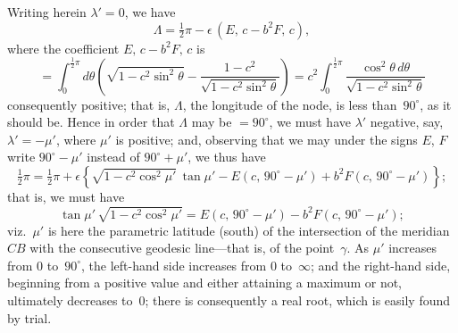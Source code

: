 \documentclass[11pt,a4paper]{article}
\theoremstyle{plain}
\theoremstyle{definition}
\begin{document}
\clearpage

Writing herein $\lambda'=0$, we have
\[
\Lambda = \tfrac{1}{2}\pi - \epsilon\,(E,\,c - b^2F,\,c),
\]
where the coefficient $E,\,c - b^2F,\,c$ is
\[
= \int_0^{\frac{1}{2}\pi}\!d\theta\left(\sqrt{1-c^2\sin^2\theta} - \frac{1-c^2}{\sqrt{1-c^2\sin^2\theta}}\right)
= c^2\!\int_0^{\frac{1}{2}\pi}\!\frac{\cos^2\theta\,d\theta}{\sqrt{1-c^2\sin^2\theta}}
\]
consequently positive; that is, $\Lambda$, the longitude of the node, is less than~$90^\circ$, as it
should be.  Hence in order that $\Lambda$ may be $= 90^\circ$, we must have $\lambda'$ negative, say,
$\lambda' = -\mu'$, where $\mu'$ is positive; and, observing that we may under the signs $E$, $F$
write $90^\circ-\mu'$ instead of $90^\circ+\mu'$, we thus have
\[
\tfrac{1}{2}\pi = \tfrac{1}{2}\pi + \epsilon\left\{\sqrt{1-c^2\cos^2\mu'}\,\tan\mu'
- E(c,\,90^\circ-\mu') + b^2F(c,\,90^\circ-\mu')\right\};
\]
that is, we must have
\[
\tan\mu'\,\sqrt{1-c^2\cos^2\mu'} = E(c,\,90^\circ-\mu') - b^2F(c,\,90^\circ-\mu');
\]
viz.\ $\mu'$ is here the parametric latitude (south) of the intersection of the meridian~$CB$
with the consecutive geodesic line---that is, of the point~$\gamma$.  As $\mu'$ increases from
$0$ to~$90^\circ$, the left-hand side increases from $0$ to~$\infty$; and the right-hand side, beginning
from a positive value and either attaining a maximum or not, ultimately decreases
to~$0$; there is consequently a real root, which is easily found by trial.
\end{document}
